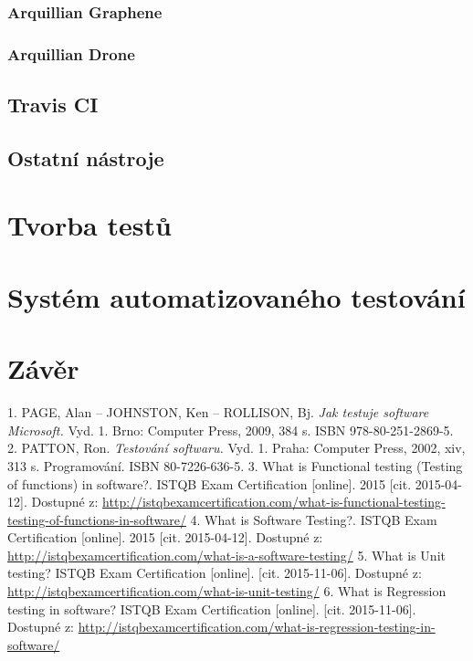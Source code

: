 \documentclass[
    color,   %
	table,   %
    twoside, %
]{fithesis3}
\begin{document}
  \subsection{Arquillian Graphene}
  \subsection{Arquillian Drone}
  \section{Travis CI}
  \section{Ostatní nástroje}
  \chapter{Tvorba testů}
  \chapter{Systém automatizovaného testování}
  \chapter{Závěr}
  
  \renewcommand{\refname}{Seznam literatury}
  \begin{thebibliography}{9}
  1. PAGE, Alan – JOHNSTON, Ken – ROLLISON, Bj. \emph{Jak testuje software Microsoft.} Vyd. 1. Brno: Computer Press, 2009, 384 s. ISBN 978-80-251-2869-5.
  2. PATTON, Ron. \emph{Testování softwaru.} Vyd. 1. Praha: Computer Press, 2002, xiv, 313 s. Programování. ISBN 80-7226-636-5. 
  3. What is Functional testing (Testing of functions) in software?. ISTQB Exam Certification [online]. 2015 [cit. 2015-04-12]. Dostupné z: \url{http://istqbexamcertification.com/what-is-functional-testing-testing-of-functions-in-software/}
  4. What is Software Testing?. ISTQB Exam Certification [online]. 2015 [cit. 2015-04-12]. Dostupné z: \url{http://istqbexamcertification.com/what-is-a-software-testing/}
  5. What is Unit testing? ISTQB Exam Certification [online]. [cit. 2015-11-06]. Dostupné z: \url{http://istqbexamcertification.com/what-is-unit-testing/}
  6. What is Regression testing in software? ISTQB Exam Certification [online]. [cit. 2015-11-06]. Dostupné z: \url{http://istqbexamcertification.com/what-is-regression-testing-in-software/}
  \end{thebibliography}
\end{document}
